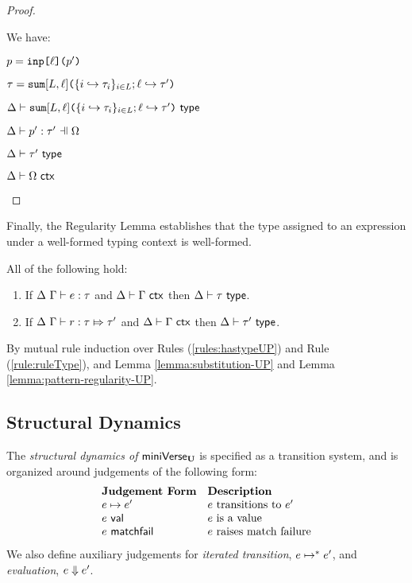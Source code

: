 {{{{\begin{proof}
\begin{byCases}
\item[\text{(\ref{rule:patType-inj})}] We have:
\begin{pfsteps*}
  \item $p=\texttt{inp}\texttt{[}\ell\texttt{](}p'\texttt{)}$ 
  \item $\tau=\texttt{sum}[L, \ell]\texttt{(}\{i \hookrightarrow \tau_{i}\}_{i \in L}; \ell \hookrightarrow \tau'\texttt{)}$ 
  \item $\Delta \vdash \texttt{sum}[L, \ell]\texttt{(}\{i \hookrightarrow \tau_{i}\}_{i \in L}; \ell \hookrightarrow \tau'\texttt{)}~\mathsf{type}$  
  \item $\patType{\pctx}{p'}{\tau'}$  
  \item $\Delta \vdash \tau'~\mathsf{type}$   
  \item $\Delta \vdash \Omega~\mathsf{ctx}$ 
\end{pfsteps*}
\resetpfcounter
\end{byCases}
\end{proof}

Finally, the Regularity Lemma establishes that the type assigned to an expression under a well-formed typing context is well-formed. 
\begin{lemma}[Regularity]\label{lemma:regularity-UP} All of the following hold:
\begin{enumerate}
\item If $\Delta~\Gamma \vdash e : \tau$ and $\Delta \vdash \Gamma~\mathsf{ctx}$ then $\Delta \vdash \tau~\mathsf{type}$.
\item If $\Delta~\Gamma \vdash r : \tau \Mapsto \tau'$ and $\Delta \vdash \Gamma~\mathsf{ctx}$ then $\Delta \vdash \tau'~\mathsf{type}$.
\end{enumerate}
\end{lemma}
\begin{proof-sketch} By mutual rule induction over Rules (\ref{rules:hastypeUP}) and Rule (\ref{rule:ruleType}), and Lemma \ref{lemma:substitution-UP} and Lemma \ref{lemma:pattern-regularity-UP}.
\end{proof-sketch}
\subsection{Structural Dynamics}\label{sec:dynamics-UP}
The \emph{structural dynamics of }$\mathsf{miniVerse}_\textbf{U}$ is specified as a transition system, and is organized around judgements of the following form:
\[\begin{array}{ll}
\textbf{Judgement Form} & \textbf{Description}\\
e \mapsto e' & \text{$e$ transitions to $e'$}\\
e~\mathsf{val} & \text{$e$ is a value}\\
e~\mathsf{matchfail} & \text{$e$ raises match failure}
\end{array}\]
We also define auxiliary judgements for \emph{iterated transition}, $e \mapsto^{*} e'$, and \emph{evaluation}, $e \Downarrow e'$.

}}}}

